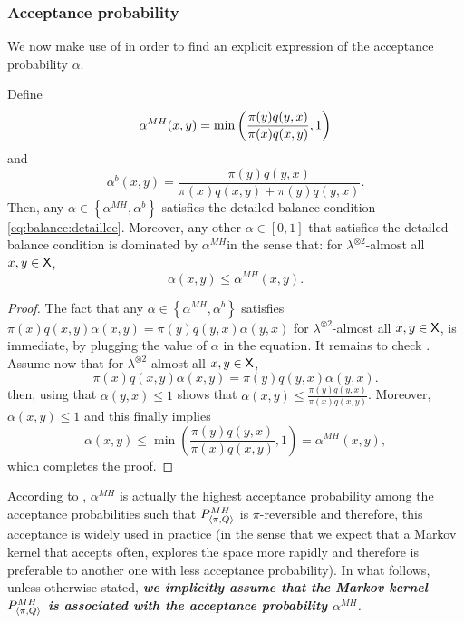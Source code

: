 \documentclass[english,graybox,envcountchap,envcountsame,sectrefs,shortlabels]{svmono}
\theoremstyle{style}
\newenvironment{svmultproof}{\small \begin{proof}}{\end{proof}}
\newcommand{\bfr}{\begin{framed}}
\newcommand{\efr}{\end{framed}}
\begin{document}
\subsubsection{Acceptance probability}
We now make use of  in order to find an explicit
expression of the acceptance probability $\alpha$.

\bfr
\begin{lemma}
\label{lem:acceptance} Define 
$$
\alpha^{MH}(x,y)=\min\left(\frac{\pi(y)q(y,x)}{\pi(x)q(x,y)},1\right)
$$
and 
$$
\alpha^{b}(x,y)=\frac{\pi(y)q(y,x)}{\pi(x)q(x,y)+\pi(y)q(y,x)}.
$$
Then, any $\alpha\in\left\{ \alpha^{MH},\alpha^{b}\right\} $ satisfies
the detailed balance condition \eqref{eq:balance:detaillee}. Moreover, any other $\alpha\in[0,1]$
that satisfies the detailed balance condition is dominated by $\alpha^{MH}$in
the sense that: for $\lambda^{\otimes2}$-almost all $x,y\in\mathsf{X}$,
\begin{equation}
\alpha(x,y)\leq\alpha^{MH}(x,y).\label{eq:accept:max}
\end{equation}

\end{lemma}
\efr
\begin{svmultproof}
The fact that any $\alpha\in\left\{ \alpha^{MH},\alpha^{b}\right\} $
satisfies $\pi(x)q(x,y)\alpha(x,y)=\pi(y)q(y,x)\alpha(y,x)$ for $\lambda^{\otimes2}$-almost
all $x,y\in\mathsf{X}$, is immediate, by plugging the value of $\alpha$ in the equation.
It remains to check . Assume now that for $\lambda^{\otimes2}$-almost
all $x,y\in\mathsf{X}$,
\[
\pi(x)q(x,y)\alpha(x,y)=\pi(y)q(y,x)\alpha(y,x).
\]
then, using that $\alpha(y,x)\leq1$ shows that $\alpha(x,y)\leq\frac{\pi(y)q(y,x)}{\pi(x)q(x,y)}$.
Moreover, $\alpha(x,y)\leq1$ and this finally implies
\[
\alpha(x,y)\leq\min\left(\frac{\pi(y)q(y,x)}{\pi(x)q(x,y)},1\right)=\alpha^{MH}(x,y),
\]
which completes the proof.
\end{svmultproof}

According to , $\alpha^{MH}$ is actually the highest
acceptance probability among the acceptance probabilities such that
$P_{\langle\pi,Q\rangle}^{MH}$ is $\pi$-reversible and therefore, this acceptance
is widely used in practice (in the sense that we expect that a Markov
kernel that accepts often, explores the space more rapidly and therefore
is preferable to another one with less acceptance probability). In
what follows, unless otherwise stated, \textbf{\emph{we implicitly
assume that the Markov kernel $P_{\langle\pi,Q\rangle}^{MH}$ is associated with the acceptance
probability $\alpha^{MH}$}}\emph{.}
\end{document}
